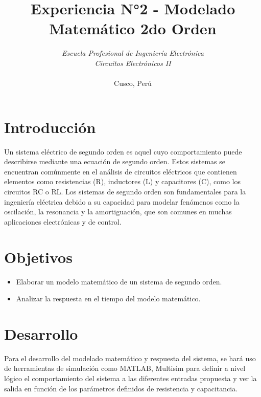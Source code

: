 \documentclass[conference]{IEEEtran}
\begin{document}
	
	\title{Experiencia N°2 - Modelado Matemático 2do Orden}
	\author{	
		\textit{Escuela Profesional de Ingeniería Electrónica}\\
		\textit{Circuitos Electrónicos II}\\\\
		Cusco, Perú
	}
	
	\maketitle
	
	\begin{abstract}
		
	\end{abstract}
	
	\begin{IEEEkeywords}

	\end{IEEEkeywords}
	
	\section{Introducción}
	Un sistema eléctrico de segundo orden es aquel cuyo comportamiento puede describirse mediante una ecuación de segundo orden. Estos sistemas se encuentran comúnmente en el análisis de circuitos eléctricos que contienen elementos como resistencias (R), inductores (L) y capacitores (C), como los circuitos RC o RL. Los sistemas de segundo orden son fundamentales para la ingeniería eléctrica debido a su capacidad para modelar fenómenos como la oscilación, la resonancia y la amortiguación, que son comunes en muchas aplicaciones electrónicas y de control.
	
	\section{Objetivos}
	
	\begin{itemize}
		\item Elaborar un modelo matemático de un sistema de segundo orden.
		\item Analizar la respuesta en el tiempo del modelo matemático.
	\end{itemize}
	
	\section{Desarrollo}
	Para el desarrollo del modelado matemático y respuesta del sistema, se hará uso de herramientas de simulación como MATLAB, Multisim para definir a nivel lógico el comportamiento del sistema a las diferentes entradas propuesta y ver la salida en función de los parámetros definidos de resistencia y capacitancia.
	
\end{document}
